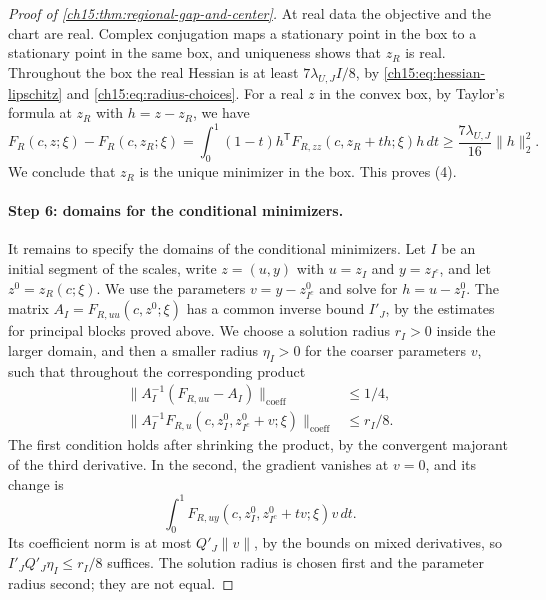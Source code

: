 \begin{proof}[Proof of \cref{ch15:thm:regional-gap-and-center}]
At real data the objective and the chart are real. Complex conjugation maps a stationary point in the box to a stationary point in the same box, and uniqueness shows that $z_R$ is real. Throughout the box the real Hessian is at least $7\lambda_{U,J}I/8$, by \eqref{ch15:eq:hessian-lipschitz} and \eqref{ch15:eq:radius-choices}. For a real $z$ in the convex box, by Taylor's formula at $z_R$ with $h=z-z_R$, we have
\[
 F_R(c,z;\xi)-F_R(c,z_R;\xi)
  =\int_0^1(1-t)h^{\mathsf T}
       F_{R,zz}(c,z_R+th;\xi)h\,dt
  \ge\frac{7\lambda_{U,J}}{16}\|h\|_2^2 .
\]
We conclude that $z_R$ is the unique minimizer in the box. This proves (4).

\paragraph{Step 6: domains for the conditional minimizers.}
It remains to specify the domains of the conditional minimizers. Let $I$ be an initial segment of the scales, write $z=(u,y)$ with $u=z_I$ and $y=z_{I^c}$, and let $z^0=z_R(c;\xi)$. We use the parameters $v=y-z^0_{I^c}$ and solve for $h=u-z^0_I$. The matrix $A_I=F_{R,uu}(c,z^0;\xi)$ has a common inverse bound $I'_J$, by the estimates for principal blocks proved above. We choose a solution radius $r_I>0$ inside the larger domain, and then a smaller radius $\eta_I>0$ for the coarser parameters $v$, such that throughout the corresponding product
\begin{equation}\label{ch15:eq:prefix-margins}
 \begin{split}
 \|A_I^{-1}(F_{R,uu}-A_I)\|_{\mathrm{coeff}}&\le1/4,\\
 \|A_I^{-1}F_{R,u}(c,z_I^0,z_{I^c}^0+v;\xi)\|_{\mathrm{coeff}}
                                       &\le r_I/8 .
 \end{split}
\end{equation}
The first condition holds after shrinking the product, by the convergent majorant of the third derivative. In the second, the gradient vanishes at $v=0$, and its change is
\[
 \int_0^1F_{R,uy}(c,z_I^0,z_{I^c}^0+tv;\xi)v\,dt .
\]
Its coefficient norm is at most $Q'_J\|v\|$, by the bounds on mixed derivatives, so $I'_JQ'_J\eta_I\le r_I/8$ suffices. The solution radius is chosen first and the parameter radius second; they are not equal.


\end{proof}
